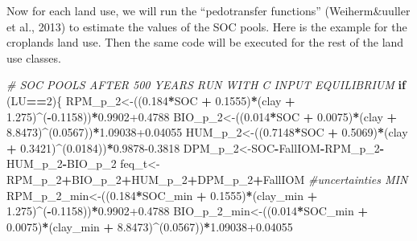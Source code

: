 \documentclass[
  10pt,
  b5paper,
]{book}
\newenvironment{Shaded}{\begin{snugshade}}{\end{snugshade}}
\newcommand{\CommentTok}[1]{\textcolor[rgb]{0.56,0.35,0.01}{\textit{#1}}}
\newcommand{\ControlFlowTok}[1]{\textcolor[rgb]{0.13,0.29,0.53}{\textbf{#1}}}
\newcommand{\DecValTok}[1]{\textcolor[rgb]{0.00,0.00,0.81}{#1}}
\newcommand{\FloatTok}[1]{\textcolor[rgb]{0.00,0.00,0.81}{#1}}
\newcommand{\NormalTok}[1]{#1}
\newcommand{\OperatorTok}[1]{\textcolor[rgb]{0.81,0.36,0.00}{\textbf{#1}}}
\newcommand{\StringTok}[1]{\textcolor[rgb]{0.31,0.60,0.02}{#1}}
\begin{document}
Now for each land use, we will run the ``pedotransfer functions'' (Weiherm\&uuller et al., 2013) to estimate the values of the SOC pools. Here is the example for the croplands land use. Then the same code will be executed for the rest of the land use classes.

\begin{Shaded}
\begin{Highlighting}[]
\CommentTok{# SOC POOLS AFTER 500 YEARS RUN WITH C INPUT EQUILIBRIUM}
\ControlFlowTok{if}\NormalTok{ (LU}\OperatorTok{==}\DecValTok{2}\NormalTok{)\{}
\NormalTok{RPM_p_}\DecValTok{2}\NormalTok{<-((}\FloatTok{0.184}\OperatorTok{*}\NormalTok{SOC }\OperatorTok{+}\StringTok{ }\FloatTok{0.1555}\NormalTok{)}\OperatorTok{*}\NormalTok{(clay }\OperatorTok{+}\StringTok{ }\FloatTok{1.275}\NormalTok{)}\OperatorTok{^}\NormalTok{(}\OperatorTok{-}\FloatTok{0.1158}\NormalTok{))}\OperatorTok{*}\FloatTok{0.9902+0.4788}
\NormalTok{BIO_p_}\DecValTok{2}\NormalTok{<-((}\FloatTok{0.014}\OperatorTok{*}\NormalTok{SOC }\OperatorTok{+}\StringTok{ }\FloatTok{0.0075}\NormalTok{)}\OperatorTok{*}\NormalTok{(clay }\OperatorTok{+}\StringTok{ }\FloatTok{8.8473}\NormalTok{)}\OperatorTok{^}\NormalTok{(}\FloatTok{0.0567}\NormalTok{))}\OperatorTok{*}\FloatTok{1.09038+0.04055}
\NormalTok{HUM_p_}\DecValTok{2}\NormalTok{<-((}\FloatTok{0.7148}\OperatorTok{*}\NormalTok{SOC }\OperatorTok{+}\StringTok{ }\FloatTok{0.5069}\NormalTok{)}\OperatorTok{*}\NormalTok{(clay }\OperatorTok{+}\StringTok{ }\FloatTok{0.3421}\NormalTok{)}\OperatorTok{^}\NormalTok{(}\FloatTok{0.0184}\NormalTok{))}\OperatorTok{*}\FloatTok{0.9878-0.3818}
\NormalTok{DPM_p_}\DecValTok{2}\NormalTok{<-SOC}\OperatorTok{-}\NormalTok{FallIOM}\OperatorTok{-}\NormalTok{RPM_p_}\DecValTok{2}\OperatorTok{-}\NormalTok{HUM_p_}\DecValTok{2}\OperatorTok{-}\NormalTok{BIO_p_}\DecValTok{2}
\NormalTok{feq_t<-RPM_p_}\DecValTok{2}\OperatorTok{+}\NormalTok{BIO_p_}\DecValTok{2}\OperatorTok{+}\NormalTok{HUM_p_}\DecValTok{2}\OperatorTok{+}\NormalTok{DPM_p_}\DecValTok{2}\OperatorTok{+}\NormalTok{FallIOM}
\CommentTok{#uncertainties  MIN}
\NormalTok{RPM_p_}\DecValTok{2}\NormalTok{_min<-((}\FloatTok{0.184}\OperatorTok{*}\NormalTok{SOC_min }\OperatorTok{+}\StringTok{ }\FloatTok{0.1555}\NormalTok{)}\OperatorTok{*}\NormalTok{(clay_min }\OperatorTok{+}\StringTok{ }\FloatTok{1.275}\NormalTok{)}\OperatorTok{^}\NormalTok{(}\OperatorTok{-}\FloatTok{0.1158}\NormalTok{))}\OperatorTok{*}\FloatTok{0.9902+0.4788}
\NormalTok{BIO_p_}\DecValTok{2}\NormalTok{_min<-((}\FloatTok{0.014}\OperatorTok{*}\NormalTok{SOC_min }\OperatorTok{+}\StringTok{ }\FloatTok{0.0075}\NormalTok{)}\OperatorTok{*}\NormalTok{(clay_min }\OperatorTok{+}\StringTok{ }\FloatTok{8.8473}\NormalTok{)}\OperatorTok{^}\NormalTok{(}\FloatTok{0.0567}\NormalTok{))}\OperatorTok{*}\FloatTok{1.09038+0.04055}

\end{Highlighting}
\end{Shaded}
\end{document}
